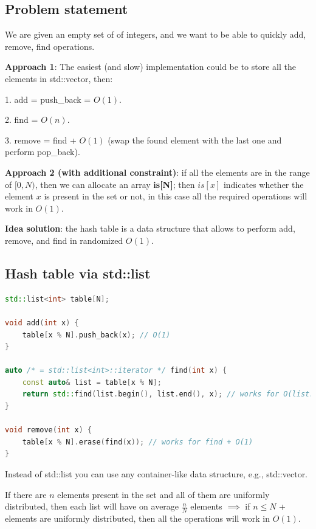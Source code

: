 \subsection{Problem statement}

We are given an empty set of of integers, and we want to be able to quickly add, remove, find operations.

\textbf{Approach 1}: The easiest (and slow) implementation could be to store all the elements in std::vector, then:

1. add = push\_back = $O(1)$.

2. find = $O(n)$.

3. remove = find + $O(1)$ (swap the found element with the last one and perform pop\_back).

\textbf{Approach 2 (with additional constraint)}: if all the elements are in the range of $[0, N)$, then we can allocate an array \textbf{is[N]}; then $is[x]$ indicates whether the element $x$ is present in the set or not, in this case all the required operations will work in $O(1)$.

\textbf{Idea solution}: the hash table is a data structure that allows to perform add, remove, and find in randomized $O(1)$.



\subsection{Hash table via std::list}

\begin{lstlisting}[language=C++]
std::list<int> table[N];

void add(int x) {
    table[x % N].push_back(x); // O(1)
}

auto /* = std::list<int>::iterator */ find(int x) {
    const auto& list = table[x % N];
    return std::find(list.begin(), list.end(), x); // works for O(list.size())
}

void remove(int x) {
    table[x % N].erase(find(x)); // works for find + O(1)
}
\end{lstlisting}

Instead of std::list you can use any container-like data structure, e.g., std::vector.

If there are $n$ elements present in the set and all of them are uniformly distributed, then each list will have on average $\frac{n}{N}$ elements $\implies$ if $n \leq N$ + elements are uniformly distributed, then all the operations will work in $O(1)$.

